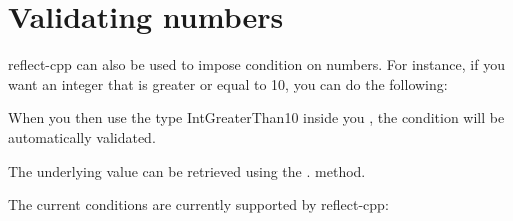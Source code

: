 \chapter{Validating numbers}
\hypertarget{md_external_2reflect-cpp_2docs_2validating__numbers}{}\label{md_external_2reflect-cpp_2docs_2validating__numbers}
\label{md_external_2reflect-cpp_2docs_2validating__numbers_autotoc_md704}%
%


reflect-\/cpp can also be used to impose condition on numbers. For instance, if you want an integer that is greater or equal to 10, you can do the following\+:


\begin{DoxyCode}{0}

\end{DoxyCode}


When you then use the type {\ttfamily Int\+Greater\+Than10} inside you {\ttfamily {}}, the condition will be automatically validated.

The underlying value can be retrieved using the {\ttfamily .} method.

The current conditions are currently supported by reflect-\/cpp\+:


\begin{DoxyItemize}
\item {\ttfamily {}}
\item {\ttfamily {}}
\item {\ttfamily {}}
\item {\ttfamily {}}
\item {\ttfamily {}}
\item {\ttfamily {}} 
\end{DoxyItemize}